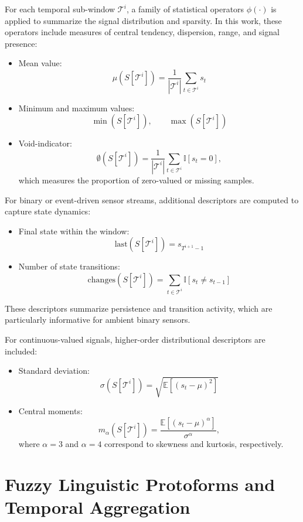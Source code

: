 \documentclass[preprint,12pt]{elsarticle}
\begin{document}
For each temporal sub-window $\mathcal{T}^i$, a family of statistical operators $\phi(\cdot)$ is applied to summarize the signal distribution and sparsity. In this work, these operators include measures of central tendency, dispersion, range, and signal presence:
\begin{itemize}
    \item Mean value:
    \[
    \mu(S[\mathcal{T}^i]) = \frac{1}{|\mathcal{T}^i|} \sum_{t \in \mathcal{T}^i} s_t
    \]
    \item Minimum and maximum values:
    \[
    \min(S[\mathcal{T}^i]), \qquad \max(S[\mathcal{T}^i])
    \]
    \item Void-indicator:
    \[
    \emptyset(S[\mathcal{T}^i]) =
    \frac{1}{|\mathcal{T}^i|}
    \sum_{t \in \mathcal{T}^i} \mathbb{I}[s_t = 0],
    \]
    which measures the proportion of zero-valued or missing samples.
\end{itemize}

For binary or event-driven sensor streams, additional descriptors are computed to capture state dynamics:
\begin{itemize}
    \item Final state within the window:
    \[
    \mathrm{last}(S[\mathcal{T}^i]) = s_{T^{i+1}-1}
    \]
    \item Number of state transitions:
    \[
    \mathrm{changes}(S[\mathcal{T}^i]) =
    \sum_{t \in \mathcal{T}^i}
    \mathbb{I}[s_t \neq s_{t-1}]
    \]
\end{itemize}

These descriptors summarize persistence and transition activity, which are particularly informative for ambient binary sensors.

For continuous-valued signals, higher-order distributional descriptors are included:
\begin{itemize}
    \item Standard deviation:
    \[
    \sigma(S[\mathcal{T}^i]) =
    \sqrt{\mathbb{E}\!\left[(s_t-\mu)^2\right]}
    \]
    \item Central moments:
    \[
    m_\alpha(S[\mathcal{T}^i]) =
    \frac{\mathbb{E}\!\left[(s_t-\mu)^\alpha\right]}{\sigma^\alpha},
    \]
    where $\alpha=3$ and $\alpha=4$ correspond to skewness and kurtosis, respectively.
\end{itemize}

\section{Fuzzy Linguistic Protoforms and Temporal Aggregation}
\label{app:fuzzy_protoforms}
\end{document}
